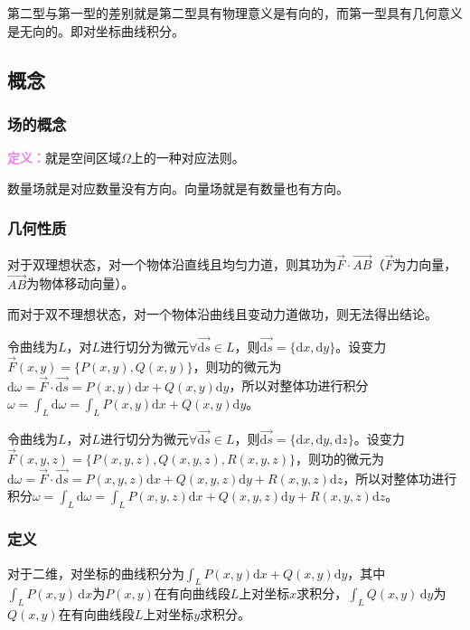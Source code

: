 第二型与第一型的差别就是第二型具有物理意义是有向的，而第一型具有几何意义是无向的。即对坐标曲线积分。

\subsection{概念}

\subsubsection{场的概念}

\textcolor{violet}{\textbf{定义：}}就是空间区域$\Omega$上的一种对应法则。

数量场就是对应数量没有方向。向量场就是有数量也有方向。

\subsubsection{几何性质}

对于双理想状态，对一个物体沿直线且均匀力道，则其功为$\vec{F}\cdot\overrightarrow{AB}$（$\vec{F}$为力向量，$\overrightarrow{AB}$为物体移动向量）。

而对于双不理想状态，对一个物体沿曲线且变动力道做功，则无法得出结论。

令曲线为$L$，对$L$进行切分为微元$\forall\overrightarrow{\textrm{d}s}\in L$，则$\overrightarrow{\textrm{d}s}=\{\textrm{d}x,\textrm{d}y\}$。设变力$\vec{F}(x,y)=\{P(x,y),Q(x,y)\}$，则功的微元为$\textrm{d}\omega=\vec{F}\cdot\overrightarrow{\textrm{d}s}=P(x,y)\textrm{d}x+Q(x,y)\textrm{d}y$，所以对整体功进行积分$\omega=\int_L\textrm{d}\omega=\int_LP(x,y)\textrm{d}x+Q(x,y)\textrm{d}y$。

令曲线为$L$，对$L$进行切分为微元$\forall\overrightarrow{\textrm{d}s}\in L$，则$\overrightarrow{\textrm{d}s}=\{\textrm{d}x,\textrm{d}y,\textrm{d}z\}$。设变力$\vec{F}(x,y,z)=\{P(x,y,z),Q(x,y,z),R(x,y,z)\}$，则功的微元为$\textrm{d}\omega=\vec{F}\cdot\overrightarrow{\textrm{d}s}=P(x,y,z)\textrm{d}x+Q(x,y,z)\textrm{d}y+R(x,y,z)\textrm{d}z$，所以对整体功进行积分$\omega=\int_L\textrm{d}\omega=\int_LP(x,y,z)\textrm{d}x+Q(x,y,z)\textrm{d}y+R(x,y,z)\textrm{d}z$。

\subsubsection{定义}

对于二维，对坐标的曲线积分为$\int_LP(x,y)\textrm{d}x+Q(x,y)\textrm{d}y$，其中$\int_LP(x,y)\,\textrm{d}x$为$P(x,y)$在有向曲线段$L$上对坐标$x$求积分，$\int_LQ(x,y)\,\textrm{d}y$为$Q(x,y)$在有向曲线段$L$上对坐标$y$求积分。

